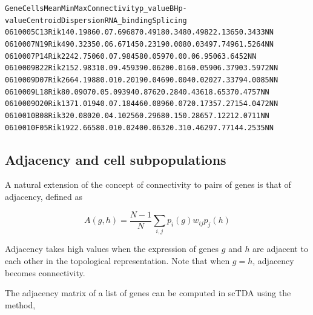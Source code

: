 \documentclass[letterpaper,10pt,english]{/usr/share/sphinx/texinputs/sphinxhowto}
\newenvironment{InvisibleVerbatim}
        {\begin{mdframed}[leftmargin=0.1\linewidth,innerleftmargin=3pt,innerrightmargin=3pt, userdefinedwidth=1\linewidth, linewidth=0pt, linecolor=white, usetwoside=false]}
        {\end{mdframed}}
\begin{document}
                \begin{InvisibleVerbatim}
\begin{alltt}{\tiny      Gene     Cells     Mean    Min     Max  Connectivity p\_value BH p-value Centroid Dispersion RNA\_binding Splicing
0610005C13Rik   14      0.1986   0.0   7.69687   0.4918     0.348    0.4982    2.1365    0.3433        N         N
0610007N19Rik   49      0.3235   0.0   6.67145   0.2319     0.008    0.0349    7.7496    1.5264        N         N
0610007P14Rik   224     2.7506   0.0   7.98458   0.0597     0.0      0.0       6.9506    3.6452        N         N
0610009B22Rik   215     2.9831   0.0   9.45939   0.0620     0.016    0.0590    6.3790    3.5972        N         N
0610009D07Rik   266     4.1988   0.0   10.2019   0.0469     0.004    0.0202    7.3379    4.0085        N         N
0610009L18Rik   8       0.0907   0.0   5.09394   0.8762     0.284    0.4361    8.6537    0.4757        N         N
0610009O20Rik   137     1.0194   0.0   7.18446   0.0896     0.072    0.1735    7.2715    4.0472        N         N
0610010B08Rik   32      0.0802   0.0   4.10256   0.2968     0.15     0.2865    7.1221    2.0711        N         N
0610010F05Rik   192     2.6658   0.0   10.0240   0.0632     0.31     0.4629    7.7714    4.2535        N         N
}
\end{alltt}

            \end{InvisibleVerbatim}
            
        
    
\subsection{Adjacency and cell subpopulations}

A natural extension of the concept of connectivity to pairs of genes is
that of adjacency, defined as

\begin{equation*}
A(g,h) = \frac{N-1}{N}\sum_{i,j} p_i(g) w_{ij} p_j(h)
\end{equation*}

Adjacency takes high values when the expression of genes $g$ and $h$ are
adjacent to each other in the topological representation. Note that when
$g=h$, adjacency becomes connectivity.

The adjacency matrix of a list of genes can be computed in scTDA using
the method,

\end{document}
